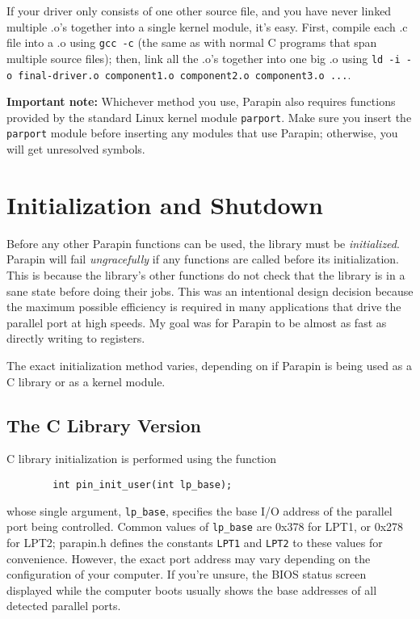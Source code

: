 \documentclass{article}
\begin{document}
If your driver only consists of one other source file, and you have
never linked multiple .o's together into a single kernel module, it's
easy.  First, compile each .c file into a .o using {\tt gcc -c} (the
same as with normal C programs that span multiple source files); then,
link all the .o's together into one big .o using {\tt ld -i -o
final-driver.o component1.o component2.o component3.o ...}.

{\bf Important note:} Whichever method you use, Parapin also requires
functions provided by the standard Linux kernel module {\tt parport}.
Make sure you insert the {\tt parport} module before inserting any
modules that use Parapin; otherwise, you will get unresolved symbols.


\section{Initialization and Shutdown}
\label{initialization}

Before any other Parapin functions can be used, the library must be
{\em initialized}.  Parapin will fail {\em ungracefully} if any
functions are called before its initialization.  This is because the
library's other functions do not check that the library is in
a sane state before doing their jobs.  This was an intentional design
decision because the maximum possible efficiency is required in many
applications that drive the parallel port at high speeds.  My goal was
for Parapin to be almost as fast as directly writing to registers.

The exact initialization method varies, depending on if Parapin
is being used as a C library or as a kernel module.

\subsection{The C Library Version}

C library initialization is performed using the function
\begin{verbatim}
        int pin_init_user(int lp_base);
\end{verbatim}
whose single argument, {\tt lp\_base}, specifies the base I/O address
of the parallel port being controlled.  Common values of {\tt lp\_base}
are 0x378 for LPT1, or 0x278 for LPT2; parapin.h defines the constants
{\tt LPT1} and {\tt LPT2} to these values for convenience.  However,
the exact port address may vary depending on the configuration of your
computer.  If you're unsure, the BIOS status screen displayed while
the computer boots usually shows the base addresses of all detected
parallel ports.
\end{document}
